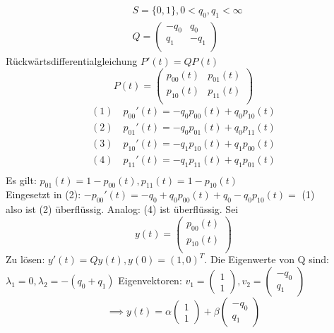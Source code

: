 \documentclass[a4paper,twoside,DIV15,BCOR12mm]{scrbook}
\begin{document}
\begin{beispiel}
  \begin{align*}
    & S=\{0,1\}, 0<q_0,q_1<\infty \\
    & Q=\left(
    \begin{array}{cc}
      -q_0 & q_0 \\
      q_1 & -q_1 \\
    \end{array}
    \right)
  \end{align*}
  Rückwärtsdifferentialgleichung $P'(t)=QP(t)$
  \[
  P(t)=\left(
  \begin{array}{cc}
    p_{00}(t) & p_{01}(t) \\
    p_{10}(t) & p_{11}(t) \\
  \end{array}
  \right)
  \]
  \begin{align*}
   (1) \quad p_{00}'(t)=-q_0p_{00}(t)+q_0p_{10}(t) \\
   (2) \quad p_{01}'(t)=-q_0p_{01}(t)+q_0p_{11}(t) \\
   (3) \quad p_{10}'(t)=-q_1p_{10}(t)+q_1p_{00}(t) \\
   (4) \quad p_{11}'(t)=-q_1p_{11}(t)+q_1p_{01}(t) \\    
  \end{align*}
  Es gilt: $p_{01}(t)=1-p_{00}(t), p_{11}(t)=1-p_{10}(t)$ \\
  Eingesetzt in (2): $-p_{00}'(t)=-q_0+q_0p_{00}(t)+q_0-q_0p_{10}(t)=$ (1) \\
  also ist (2) überflüssig. Analog: (4) ist überflüssig. Sei
  \[
  y(t)=\left(
  \begin{array}{c}
    p_{00}(t) \\ p_{10}(t) \\
  \end{array}
  \right) \]
  Zu lösen: $y'(t)=Qy(t), y(0)=(1,0)^T$. Die Eigenwerte von Q sind:
  $\lambda_1=0, \lambda_2=-(q_0+q_1)$ Eigenvektoren:
  $v_1=\begin{pmatrix} 1 \\ 1 \end{pmatrix}, v_2 =\begin{pmatrix} -q_0 \\ q_1 \end{pmatrix}$
  \[
  \implies y(t)=\alpha\begin{pmatrix} 1 \\ 1\end{pmatrix}+\beta\begin{pmatrix} -q_0 \\ q_1 

\end{pmatrix}\]
\end{beispiel}
\end{document}
